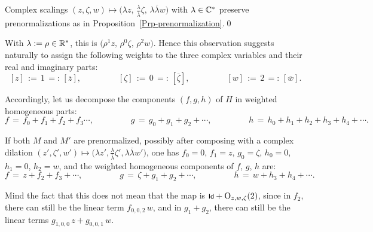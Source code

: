 \documentclass[12pt,twoside,leqno,openany]{amsart}
\begin{document}
\begin{Observation}
Complex scalings $(z, \zeta, w) \longmapsto 
\big( \lambda z,\, \frac{\lambda}{\overline{\lambda}} \zeta,\,
\lambda\overline{\lambda} w \big)$ with $\lambda \in \mathbb{C}^\ast$ preserve
prenormalizations as in 
Proposition~{\ref{Prp-prenormalization}}.\qed
\end{Observation}

With $\lambda := \rho \in \mathbb{R}^\ast$, this is
$\big( \rho^1 z,\, \rho^0 \zeta,\, \rho^2 w\big)$. Hence
this observation suggests naturally to assign the following weights
to the three complex variables and their real and imaginary parts:
\[
[z]
\,:=\,
1
\,=:\,
[\overline{z}],
\ \ \ \ \ \ \ \ \ \ \ \ \ \ \ \ \ \ \ \
[\zeta]
\,:=\,
0
\,=:\,
[\overline{\zeta}],
\ \ \ \ \ \ \ \ \ \ \ \ \ \ \ \ \ \ \ \
[w]
\,:=\,
2
\,=:\,
[\overline{w}].
\]

Accordingly, 
let us decompose the components $(f,g,h)$ of $H$
in weighted homogeneous parts:
\[
f
\,=\,
f_0+f_1+f_2+f_3\cdots,
\ \ \ \ \ \ \ \ \ \ \ \ \ \ \ \ \ \ \ \
g
\,=\,
g_0+g_1+g_2+\cdots,
\ \ \ \ \ \ \ \ \ \ \ \ \ \ \ \ \ \ \ \
h
\,=\,
h_0+h_1+h_2+h_3+h_4+\cdots.
\]

\begin{Proposition}
\label{Prp-f-g-h-nu-0-1-2}
If both $M$ and $M'$ are prenormalized, 
possibly after composing
with a complex dilation $(z', \zeta', w') \longmapsto 
\big( \lambda z', \frac{\lambda}{\overline{\lambda}}
\zeta', \lambda\overline{\lambda} w')$, 
one has $f_0 = 0$, $f_1 = z$, $g_0 = \zeta$, 
$h_0 = 0$, $h_1 = 0$, $h_2 = w$, and
the weighted homogeneous components of
$f$, $g$, $h$ are:
\[
f
\,=\,
z
+
f_2
+
f_3
+\cdots,
\ \ \ \ \ \ \ \ \ \ \ \ \ \ \ \ \ \ \ \
g
\,=\,
\zeta
+
g_1
+
g_2
+\cdots,
\ \ \ \ \ \ \ \ \ \ \ \ \ \ \ \ \ \ \ \
h
\,=\,
w
+
h_3
+
h_4
+\cdots.
\]
\end{Proposition}

Mind the fact that this does not mean that the map
is $\text{\footnotesize{\sf Id}} + {\rm O}_{z,w,\zeta}(2)$, 
since in $f_2$, there can still be the linear term $f_{0,0,2}\, w$, 
and in $g_1 + g_2$, there can still be the
linear terms $g_{1,0,0}\, z + g_{0,0,1}\, w$.
\end{document}
